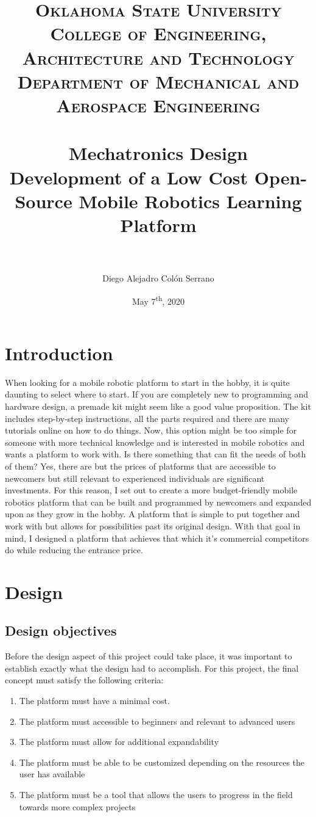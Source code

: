 \documentclass[12pt, letterpaper,titlepage]{article}
\title{	
\normalfont \normalsize 
\textsc{Oklahoma State University} \\ [25pt] 
\textsc{College of Engineering, Architecture and Technology} \\ [25pt]
\textsc{Department of Mechanical and Aerospace Engineering} \\ [25pt]
\horrule{0.5pt} \\[0.4cm] %
\huge  Mechatronics Design \\ 
\huge  Development of a Low Cost Open-Source Mobile Robotics Learning Platform\\
\horrule{0.5pt} \\[0.5cm] %
}
\author{Diego Alejadro Colón Serrano}
\date{May 7\textsuperscript{th}, 2020}
\begin{document}
\maketitle
\tableofcontents
\pagebreak

\section{Introduction}

	When looking for a mobile robotic platform to start in the hobby, it is quite daunting to select where to start. If you are completely new to programming and hardware design, a premade kit might seem like a good value proposition. The kit includes step-by-step instructions, all the parts required and there are many tutorials online on how to do things. Now, this option might be too simple for someone with more technical knowledge and is interested in mobile robotics and wants a platform to work with. Is there something that can fit the needs of both of them? Yes, there are but the prices of platforms that are accessible to newcomers but still relevant to experienced individuals are significant investments. For this reason, I set out to create a more budget-friendly mobile robotics platform that can be built and programmed by newcomers and expanded upon as they grow in the hobby. A platform that is simple to put together and work with but allows for possibilities past its original design. With that goal in mind, I designed a platform that achieves that which it's commercial competitors do while reducing the entrance price. \cite{DUMMY:1}

\section{Design}

\subsection{Design objectives}

	Before the design aspect of this project could take place, it was important to establish exactly what the design had to accomplish. For this project, the final concept must satisfy the following criteria:

	\begin{enumerate}
		\item The platform must have a minimal cost.
		\item The platform must accessible to beginners and relevant to advanced users
		\item The platform must allow for additional expandability
		\item The platform must be able to be customized depending on the resources the user has available
		\item The platform must be a tool that allows the users to progress in the field towards more complex projects
	\end{enumerate}
\end{document}
